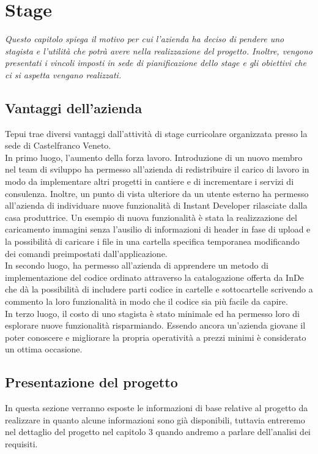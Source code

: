 \chapter{Stage}
\textit{Questo capitolo spiega il motivo per cui l'azienda ha deciso di pendere uno stagista e l'utilità che potrà avere nella realizzazione del progetto. Inoltre, vengono presentati i vincoli imposti in sede di pianificazione dello stage e gli obiettivi che ci si aspetta vengano realizzati.}

\section{Vantaggi dell'azienda}
Tepui trae diversi vantaggi dall'attività di stage curricolare organizzata presso la sede di Castelfranco Veneto.\\

In primo luogo, l'aumento della forza lavoro. Introduzione di un nuovo membro nel team di sviluppo ha permesso all'azienda di redistribuire il carico di lavoro in modo da implementare altri progetti in cantiere e di incrementare i servizi di consulenza. Inoltre, un punto di vista ulteriore da un utente esterno ha permesso all'azienda di individuare nuove funzionalità di Instant Developer rilasciate dalla casa produttrice.
Un esempio di nuova funzionalità è stata la realizzazione del caricamento immagini senza l'ausilio di informazioni di header in fase di upload e la possibilità di caricare i file in una cartella specifica temporanea modificando dei comandi preimpostati dall'applicazione.
\\

In secondo luogo, ha permesso all'azienda di apprendere un metodo di implementazione del codice ordinato attraverso la catalogazione offerta da InDe che dà la possibilità di includere parti codice in cartelle e sottocartelle scrivendo a commento la loro funzionalità in modo che il codice sia più facile da capire.
\\

In terzo luogo, il costo di uno stagista è stato minimale ed ha permesso loro di esplorare nuove funzionalità risparmiando. Essendo ancora un'azienda giovane il poter conoscere e migliorare la propria operatività a prezzi minimi è considerato un ottima occasione. 


\section{Presentazione del progetto}
In questa sezione verranno esposte le informazioni di base relative al progetto da realizzare in quanto alcune informazioni sono già disponibili, tuttavia entreremo nel dettaglio del progetto nel capitolo 3 quando andremo a parlare dell'analisi dei requisiti.

